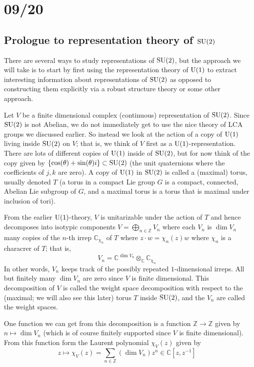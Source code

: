 \documentclass[../../rtnotes.tex]{subfiles}
\begin{document}
\section{09/20}
\subsection{Prologue to representation theory of $\operatorname{SU}(2)$}
There are several ways to study representations of $\operatorname{SU}(2)$, but the approach we will take is to start by first using the representation theory of $\operatorname{U}(1)$ to extract interesting information about representations of $\operatorname{SU}(2)$ as opposed to constructing them explicitly via a robust structure theory or some other approach.

Let $V$ be a finite dimensional complex (continuous) representation of $\operatorname{SU}(2)$. Since $\operatorname{SU}(2)$ is not Abelian, we do not immediately get to use the nice theory of LCA groups we discussed earlier. So instead we look at the action of a copy of $\operatorname{U}(1)$ living inside $\operatorname{SU}(2)$ on $V$; that is, we think of $V$ first as a $\operatorname{U}(1)$-representation. There are lots of different copies of $\operatorname{U}(1)$ inside of $\operatorname{SU}(2)$, but for now think of the copy given by $\{\cos(\theta) + \sin(\theta)i\}\subset \operatorname{SU}(2)$ (the unit quaternions where the coefficients of $j,k$ are zero). A copy of $\operatorname{U}(1)$ in $\operatorname{SU}(2)$ is called a (maximal) torus, usually denoted $T$ (a torus in a compact Lie group $G$ is a compact, connected, Abelian Lie subgroup of $G$, and a maximal torus is a torus that is maximal under inclusion of tori).

From the earlier $\operatorname{U}(1)$-theory, $V$ is unitarizable under the action of $T$ and hence decomposes into isotypic components $V = \bigoplus_{n\in\mathbb Z}V_n$ where each $V_n$ is $\dim V_n$ many copies of the $n$-th irrep $\mathbb C_{\chi_n}$ of $T$ where $z\cdot w = \chi_n(z)w$ where $\chi_n$ is a characrer of $T$; that is,
\[V_n = \mathbb C^{\dim V_n}\otimes_{\mathbb C}\mathbb C_{\chi_n}\]
In other words, $V_n$ keeps track of the possibly repeated $1$-dimensional irreps. All but finitely many $\dim V_n$ are zero since $V$ is finite dimensional. This decomposition of $V$ is called the weight space decomposition with respect to the (maximal; we will also see this later) torus $T$ inside $\operatorname{SU}(2)$, and the $V_n$ are called the weight spaces.

One function we can get from this decomposition is a function $\mathbb Z\to\mathbb Z$ given by $n\mapsto \dim V_n$ (which is of course finitely supported since $V$ is finite dimensional). From this function form the Laurent polynomial $\chi_V(z)$ given by
\[z\mapsto \chi_V(z) = \sum_{n\in \mathbb Z}(\dim V_n)z^n\in\mathbb C[z,z^{-1}]\]
\end{document}
